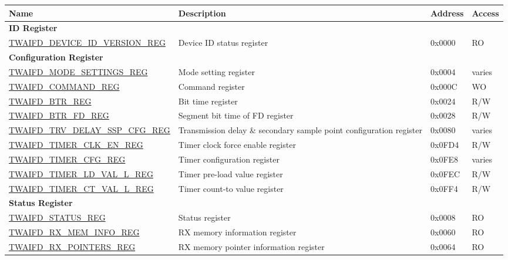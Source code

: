 \begin{longtable}{ | p{6cm} | p{7.2cm} | p{1.3cm} | p{1.5cm} | }
\hline\rowcolor{lightgray}
\textbf{Name} & \textbf{Description} &  \textbf{Address} & \textbf{Access} \\ \hline
\endhead
\multicolumn{4}{|l|}{\textbf{ID Register}} \\ \hline
\hyperref[regdesc:TWAIFDDEVICEIDVERSIONREG]{TWAIFD\_DEVICE\_ID\_VERSION\_REG} & Device ID status register & 0x0000 & RO \\ \hline
\multicolumn{4}{|l|}{\textbf{Configuration Register}} \\ \hline
\hyperref[regdesc:TWAIFDMODESETTINGSREG]{TWAIFD\_MODE\_SETTINGS\_REG} & Mode setting register & 0x0004 & varies \\ \hline
\hyperref[regdesc:TWAIFDCOMMANDREG]{TWAIFD\_COMMAND\_REG} & Command register & 0x000C & WO \\ \hline
\hyperref[regdesc:TWAIFDBTRREG]{TWAIFD\_BTR\_REG} & Bit time register & 0x0024 & R/W \\ \hline
\hyperref[regdesc:TWAIFDBTRFDREG]{TWAIFD\_BTR\_FD\_REG} & Segment bit time of FD register & 0x0028 & R/W \\ \hline
\hyperref[regdesc:TWAIFDTRVDELAYSSPCFGREG]{TWAIFD\_TRV\_DELAY\_SSP\_CFG\_REG} & Transmission delay \& secondary sample point configuration register & 0x0080 & varies \\ \hline
\hyperref[regdesc:TWAIFDTIMERCLKENREG]{TWAIFD\_TIMER\_CLK\_EN\_REG} & Timer clock force enable register & 0x0FD4 & R/W \\ \hline
\hyperref[regdesc:TWAIFDTIMERCFGREG]{TWAIFD\_TIMER\_CFG\_REG} & Timer configuration register & 0x0FE8 & varies \\ \hline
\hyperref[regdesc:TWAIFDTIMERLDVALLREG]{TWAIFD\_TIMER\_LD\_VAL\_L\_REG} & Timer pre-load value register & 0x0FEC & R/W \\ \hline
\hyperref[regdesc:TWAIFDTIMERCTVALLREG]{TWAIFD\_TIMER\_CT\_VAL\_L\_REG} & Timer count-to value register & 0x0FF4 & R/W \\ \hline
\multicolumn{4}{|l|}{\textbf{Status Register}} \\ \hline
\hyperref[regdesc:TWAIFDSTATUSREG]{TWAIFD\_STATUS\_REG} & Status register & 0x0008 & RO \\ \hline
\hyperref[regdesc:TWAIFDRXMEMINFOREG]{TWAIFD\_RX\_MEM\_INFO\_REG} & RX memory information register & 0x0060 & RO \\ \hline
\hyperref[regdesc:TWAIFDRXPOINTERSREG]{TWAIFD\_RX\_POINTERS\_REG} & RX memory pointer information register & 0x0064 & RO \\ \hline

\end{longtable}

